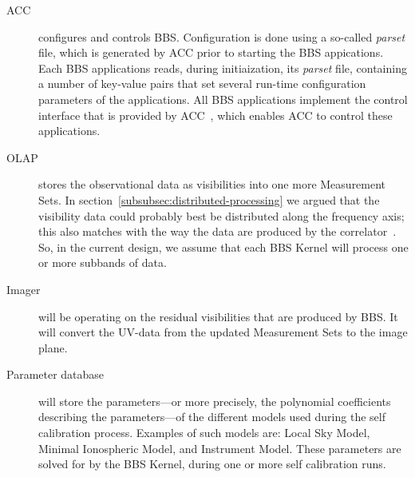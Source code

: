 \documentclass[10pt]{lofar}
\begin{document}
\begin{description}
\item [ACC] configures and controls BBS. Configuration is done using a
so-called \emph{parset} file, which is generated by ACC prior to starting the
BBS appications. Each BBS applications reads, during initiaization, its
\emph{parset} file, containing a number of key-value pairs that set several
run-time configuration parameters of the applications. All BBS applications
implement the control interface that is provided by
ACC~\cite{LOFAR-ASTRON-SDD-037}, which enables ACC to control these
applications.
\item [OLAP] stores the observational data as visibilities into one more
Measurement Sets. In section~\ref{subsubsec:distributed-processing} we argued
that the visibility data could probably best be distributed along the
frequency axis; this also matches with the way the data are produced by the
correlator~\cite{LOFAR-ASTRON-SDD-036}. So, in the current design, we assume
that each BBS Kernel will process one or more subbands of data.
\item [Imager] will be operating on the residual visibilities that are
produced by BBS. It will convert the UV-data from the updated Measurement Sets
to the image plane.
\item [Parameter database] \sloppy will store the parameters---or more
precisely, the polynomial coefficients describing the parameters---of the
different models used during the self calibration process. Examples of such
models are: Local Sky Model, Minimal Ionospheric Model, and Instrument
Model. These parameters are solved for by the BBS Kernel, during one or more
self calibration runs.
\end{description}
\end{document}
